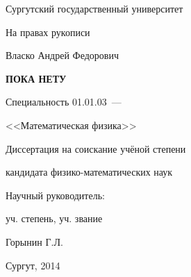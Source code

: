 \thispagestyle{empty}

\begin{center}
    Сургутский государственный университет
\par
\end{center}

\vspace{20mm} 
\begin{flushright}
На правах рукописи \\
\end{flushright}

\vspace{30mm}
\begin{center}
{\large Власко Андрей Федорович}
\end{center}

\vspace{5mm}
\begin{center}
{\bf \large ПОКА НЕТУ 
\par}

\vspace{10mm}
{%
Специальность 01.01.03~---

<<Математическая физика>>
}

\vspace{10mm}
Диссертация на соискание учёной степени

кандидата физико-математических наук
\end{center}

\vspace{20mm}
\begin{flushright}
Научный руководитель:

уч. степень, уч. звание

Горынин Г.Л.

\end{flushright}

\vspace{20mm}
\begin{center}
{Сургут, 2014}
\end{center}

\newpage
